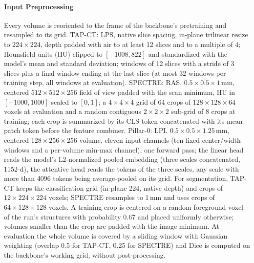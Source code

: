 \paragraph{Input Preprocessing} Every volume is reoriented to the frame of the backbone's pretraining and resampled to its grid. TAP-CT: LPS, native slice spacing, in-plane trilinear resize to $224\times224$, depth padded with air to at least 12 slices and to a multiple of 4; Hounsfield units (HU) clipped to $[-1008, 822]$ and standardized with the model's mean and standard deviation; windows of 12 slices with a stride of 3 slices plus a final window ending at the last slice (at most 32 windows per training step, all windows at evaluation). SPECTRE: RAS, $0.5\times0.5\times1$\,mm, centered $512\times512\times256$ field of view padded with the scan minimum, HU in $[-1000, 1000]$ scaled to $[0,1]$; a $4\times4\times4$ grid of 64 crops of $128\times128\times64$ voxels at evaluation and a random contiguous $2\times2\times2$ sub-grid of 8 crops at training; each crop is summarized by its CLS token concatenated with its mean patch token before the feature combiner. Pillar-0: LPI, $0.5\times0.5\times1.25$\,mm, centered $128\times256\times256$ volume, eleven input channels (ten fixed center/width windows and a per-volume min-max channel), one forward pass; the linear head reads the model's L2-normalized pooled embedding (three scales concatenated, 1152-d), the attentive head reads the tokens of the three scales, any scale with more than 4096 tokens being average-pooled on its grid. For segmentation, TAP-CT keeps the classification grid (in-plane 224, native depth) and crops of $12\times224\times224$ voxels; SPECTRE resamples to 1\,mm and uses crops of $64\times128\times128$ voxels. A training crop is centered on a random foreground voxel of the run's structures with probability 0.67 and placed uniformly otherwise; volumes smaller than the crop are padded with the image minimum. At evaluation the whole volume is covered by a sliding window with Gaussian weighting (overlap 0.5 for TAP-CT, 0.25 for SPECTRE) and Dice is computed on the backbone's working grid, without post-processing.

